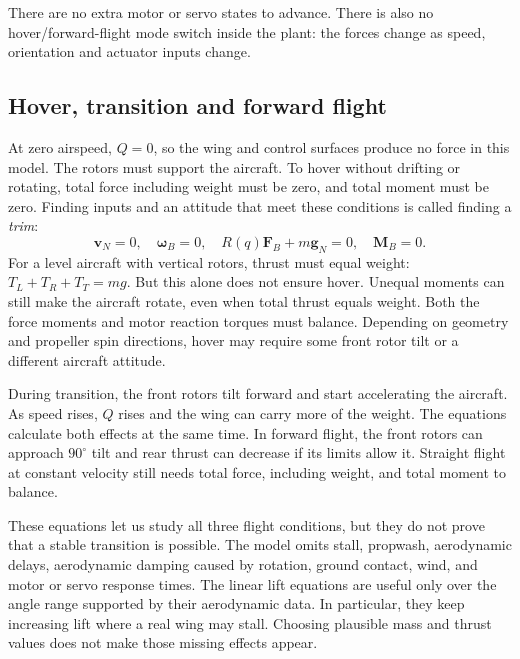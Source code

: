 \documentclass[11pt,a4paper]{article}
\numberwithin{equation}{section}
\newcommand{\vect}[1]{\boldsymbol{#1}}
\begin{document}
There are no extra motor or servo states to advance. There is also no
hover/forward-flight mode switch inside the plant: the forces change as
speed, orientation and actuator inputs change.

\subsection{Hover, transition and forward flight}
At zero airspeed, $Q=0$, so the wing and control surfaces produce no force
in this model. The rotors must support the aircraft.
To hover without drifting or rotating, total force including weight must
be zero, and total moment must be zero. Finding inputs and an attitude that
meet these conditions is called finding a \emph{trim}:
\begin{equation}\label{eq:hover-trim}
 \vect v_N=0,\quad\vect\omega_B=0,\quad
 R(q)\vect F_B+m\vect g_N=0,\quad\vect M_B=0.
\end{equation}
For a level aircraft with vertical rotors, thrust must equal weight:
$T_L+T_R+T_T=mg$. But this alone does not ensure hover. Unequal moments
can still make the aircraft rotate, even when total thrust equals weight.
Both the force moments and motor reaction torques must balance. Depending
on geometry and propeller spin directions, hover may require some front
rotor tilt or a different aircraft attitude.

During transition, the front rotors tilt forward and start accelerating the
aircraft. As speed rises, $Q$ rises and the wing can carry more of the
weight. The equations calculate both effects at the same time.
In forward flight, the front rotors can approach $90^\circ$ tilt and rear
thrust can decrease if its limits allow it. Straight flight at constant
velocity still needs total force, including weight, and total moment to
balance.

These equations let us study all three flight conditions, but they do not
prove that a stable transition is possible. The model omits stall,
propwash, aerodynamic delays, aerodynamic damping caused by rotation,
ground contact, wind, and motor or servo response times.
The linear lift equations are useful only over the angle range supported
by their aerodynamic data. In particular, they keep increasing lift where
a real wing may stall. Choosing plausible mass and thrust values does not
make those missing effects appear.
\end{document}
